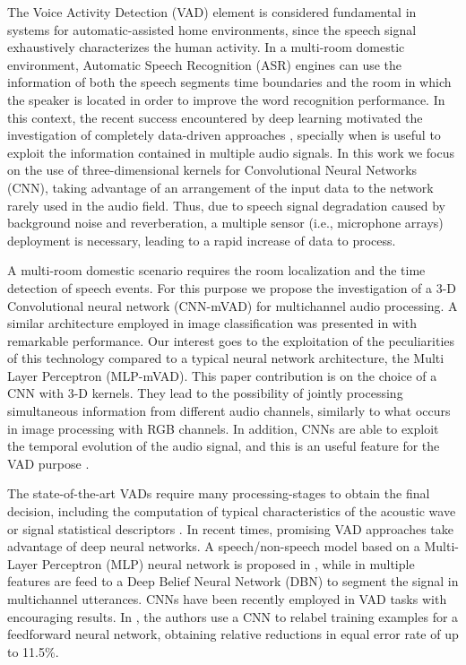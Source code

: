 The Voice Activity Detection (VAD) element is considered fundamental in systems for automatic-assisted home environments, since the speech signal exhaustively characterizes the human activity. In a multi-room domestic environment, Automatic Speech Recognition (ASR) engines can use the information of both the speech segments time boundaries and the room in which the speaker is located in order to improve the  word recognition performance.
In this context, the recent success encountered by deep learning motivated the investigation of completely data-driven approaches \cite{Ferroni15a,ijcnn2016-vad}, specially when is useful to exploit the information contained in multiple audio signals. In this work we focus on the use of three-dimensional kernels for Convolutional Neural Networks (CNN), taking advantage of an arrangement of the input data to the network rarely used in the audio field.
Thus, due to speech signal degradation caused by background noise and reverberation, a multiple sensor (i.e., microphone arrays) deployment is necessary, leading to a rapid increase of data to process.

A multi-room domestic scenario requires the room localization and the time detection of speech events. For this purpose we propose the investigation of a 3-D Convolutional neural network (CNN-mVAD) for multichannel audio processing. 
A similar architecture employed in image classification was presented in \cite{krizhevsky2012imagenet} with remarkable performance.
Our interest goes to the exploitation of the peculiarities of this technology compared to a typical neural network architecture, the Multi Layer Perceptron (MLP-mVAD). This paper contribution is on the choice of a CNN with 3-D kernels. They lead to the possibility of jointly processing simultaneous information from different audio channels, similarly to what occurs in image processing with RGB channels. In addition, CNNs are able to exploit the temporal evolution of the audio signal, and this is an useful feature for the VAD purpose \cite{zhang_2016_vad}.
 
The state-of-the-art VADs require many processing-stages to obtain the final decision, including the computation of typical characteristics of the acoustic wave or signal statistical descriptors \cite{giannoulis2014athena}. In recent times, promising VAD approaches take advantage of deep neural networks. A speech/non-speech model based on a Multi-Layer Perceptron (MLP) neural network is proposed in \cite{abadl2f}, while in \cite{morales2014distant} multiple features are feed to a Deep Belief Neural Network (DBN) to segment the signal in multichannel utterances. CNNs have been recently employed in VAD tasks \cite{mcloughlin2015low,6854054} with encouraging results. In \cite{Price2016}, the authors use a CNN to relabel training examples for a feedforward neural network, obtaining relative reductions in equal error rate of up to 11.5\%.


